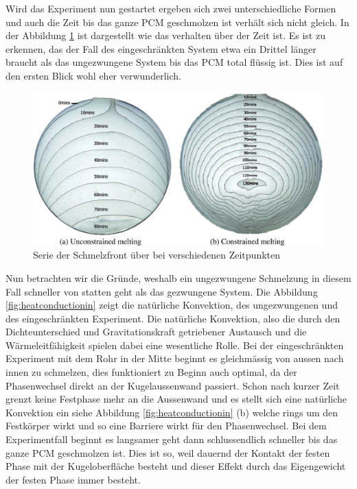 \documentclass[11pt,a4paper]{scrartcl}
\begin{document}
Wird das Experiment nun gestartet ergeben sich zwei unterschiedliche Formen und auch die Zeit bis das ganze PCM geschmolzen ist verhält sich nicht gleich. In der Abbildung \ref{fig:meltingphasefront} ist dargestellt wie das verhalten über der Zeit ist. Es ist zu erkennen, das der Fall des eingeschränkten System etwa ein Drittel länger braucht als das ungezwungene System bis das PCM total flüssig ist. Dies ist auf den ersten Blick wohl eher verwunderlich.

\begin{figure}[h!]
\begin{center}
\includegraphics[scale=0.35]{images/meltingphasefront.jpg}
\caption{Serie der Schmelzfront über bei verschiedenen Zeitpunkten \cite{meltingpaper}}
\label{fig:meltingphasefront}
\end{center}
\end{figure}

Nun betrachten wir die Gründe, weshalb ein ungezwungene Schmelzung in diesem
Fall schneller von statten geht als das gezwungene System. Die Abbildung
\ref{fig:heatconductionin} zeigt die natürliche Konvektion, des ungezwungenen
und des eingeschränkten Experiment. Die natürliche Konvektion, also die durch
den Dichteunterschied und Gravitationskraft getriebener Austausch und die
Wärmeleitfähigkeit spielen dabei eine wesentliche Rolle. Bei der eingeschränkten
Experiment mit dem Rohr in der Mitte beginnt es gleichmässig von aussen nach
innen zu schmelzen, dies funktioniert zu Beginn auch optimal, da der
Phasenwechsel direkt an der Kugelaussenwand passiert. Schon nach kurzer Zeit
grenzt keine Festphase mehr an die Aussenwand und es stellt sich eine natürliche
Konvektion ein siehe Abbildung \ref{fig:heatconductionin} (b) welche rings um
den Festkörper wirkt und so eine Barriere wirkt für den Phasenwechsel. Bei dem
Experimentfall beginnt es langsamer geht dann schlussendlich schneller bis das
ganze PCM geschmolzen ist. Dies ist so, weil dauernd der Kontakt der festen
Phase mit der Kugeloberfläche besteht und dieser Effekt durch das Eigengewicht
der festen Phase immer besteht.
\end{document}
